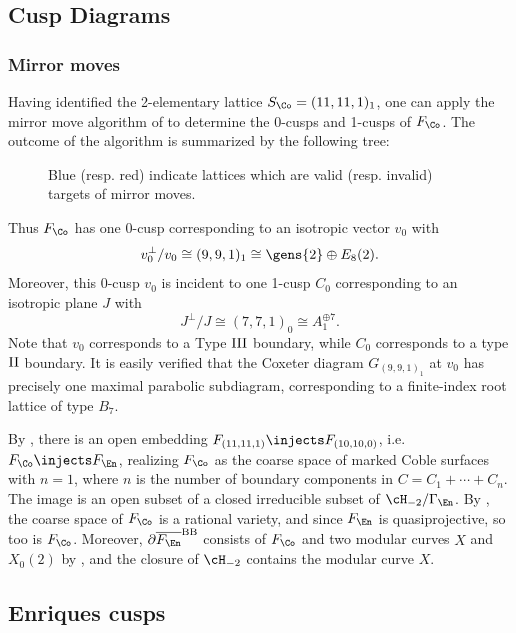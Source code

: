 \documentclass[../main.tex]{subfiles}
\begin{document}
\subsection{Cusp Diagrams}

\subsubsection{Mirror moves}\label{sec:mirror-moves}
Having identified the 2-elementary lattice $S_\Co = (11, 11, 1)_1$, one can apply the mirror move algorithm of \cite[Thm. 5.10]{AE22} to determine the 0-cusps and 1-cusps of $F_\Co$.
The outcome of the algorithm is summarized by the following tree:

\begin{figure}[H]
    \centering
    
    \caption{Blue (resp. red) indicate lattices which are valid (resp. invalid) targets of mirror moves.}
    \label{fig:enter-label}
\end{figure}

Thus $F_\Co$ has one 0-cusp corresponding to an isotropic vector $v_0$ with \[
v_0^\perp/v_0 \cong (9,9,1)_1 \cong \gens{2} \oplus E_{8}(2)
.\] 
Moreover, this 0-cusp $v_0$ is incident to one 1-cusp $C_0$ corresponding to an isotropic plane $J$ with 
\[
J^\perp/J \cong (7,7,1)_0 \cong A_1^{\oplus 7}
.\]
Note that $v_0$ corresponds to a Type $\rm{III}$ boundary, while $C_0$ corresponds to a type $\rm{II}$ boundary. It is easily verified that the Coxeter diagram $G_{(9,9,1)_1}$ at $v_0$ has precisely one maximal parabolic subdiagram, corresponding to a finite-index root lattice of type $B_7$. 


By \cite[Prop. 5.46]{CD12}, there is an open embedding $F_{(11, 11, 1)} \injects F_{(10,10,0)}$, i.e. $F_\Co \injects F_\En$, realizing $F_\Co$ as the coarse space of marked Coble surfaces with $n=1$, where $n$ is the number of boundary components in $C = C_1 + \cdots + C_n$. The image is an open subset of a closed irreducible subset of $\cH_{-2}/\Gamma_\En$. By \cite[Thm. 5.8.2]{CD12}, the coarse space of $F_\Co$ is a rational variety, and since $F_\En$ is quasiprojective, so too is $F_\Co$. Moreover, $\partial \overline{F_{\En}}^{\mathrm{BB}}$ consists of $F_{\Co}$ and two modular curves $X$ and $X_0(2)$ by \cite[Rem.5.9.12]{CD12}, and the closure of $\cH_{-2}$ contains the modular curve $X$.

\subsection{Enriques cusps}
\end{document}
